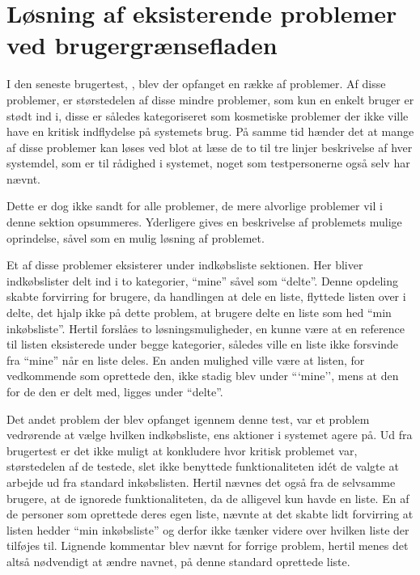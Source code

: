 \section{Løsning af eksisterende problemer ved brugergrænsefladen}
I den seneste brugertest, , blev der opfanget en række af problemer.
Af disse problemer, er størstedelen af disse mindre problemer, som kun en enkelt bruger er stødt ind i, disse er således kategoriseret som kosmetiske problemer der ikke ville have en kritisk indflydelse på systemets brug.
På samme tid hænder det at mange af disse problemer kan løses ved blot at læse de to til tre linjer beskrivelse af hver systemdel, som er til rådighed i systemet, noget som testpersonerne også selv har nævnt.

Dette er dog ikke sandt for alle problemer, de mere alvorlige problemer vil i denne sektion opsummeres.
Yderligere gives en beskrivelse af problemets mulige oprindelse, såvel som en mulig løsning af problemet.

Et af disse problemer eksisterer under indkøbsliste sektionen.
Her bliver indkøbslister delt ind i to kategorier, ``mine'' såvel som ``delte''.
Denne opdeling skabte forvirring for brugere, da handlingen at dele en liste, flyttede listen over i delte, det hjalp ikke på dette problem, at brugere delte en liste som hed ``min inkøbsliste''.
Hertil forslåes to løsningsmuligheder, en kunne være at en reference til listen eksisterede under begge kategorier, således ville en liste ikke forsvinde fra ``mine'' når en liste deles.
En anden mulighed ville være at listen, for vedkommende som oprettede den, ikke stadig blev under ```mine'', mens at den for de den er delt med, ligges under ``delte''.

Det andet problem der blev opfanget igennem denne test, var et problem vedrørende at vælge hvilken indkøbsliste, ens aktioner i systemet agere på.
Ud fra brugertest er det ikke muligt at konkludere hvor kritisk problemet var, størstedelen af de testede, slet ikke benyttede funktionaliteten idét de valgte at arbejde ud fra standard inkøbslisten.
Hertil nævnes det også fra de selvsamme brugere, at de ignorede funktionaliteten, da de alligevel kun havde en liste.
En af de personer som oprettede deres egen liste, nævnte at det skabte lidt forvirring at listen hedder ``min inkøbsliste'' og derfor ikke tænker videre over hvilken liste der tilføjes til.
Lignende kommentar blev nævnt for forrige problem, hertil menes det altså nødvendigt at ændre navnet, på denne standard oprettede liste.

